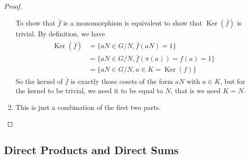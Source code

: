 \documentclass{article}
\begin{document}
\begin{proof}
\begin{enumerate}
To show that $\bar{f}$ is a monomorphism is equivalent to show that $\operatorname{Ker}(\bar{f})$ is trivial. By definition, we have
\begin{align*}
\begin{aligned}
\operatorname{Ker}(\bar{f}) &=\{a N \in G / N, \bar{f}(a N)=1\} \\
&=\{a N \in G / N, \bar{f}(\pi(a))=f(a)=1\} \\
&=\{a N \in G / N, a \in K=\operatorname{Ker}(f)\}
\end{aligned}
\end{align*}
So the kernel of $\bar{f}$ is exactly those cosets of the form $a N$ with $a \in K$, but for the kernel to be trivial, we need it to be equal to $N$, that is we need $K=N$.
\item This is just a combination of the first two parts.
\end{enumerate}
\end{proof}

\subsection{Direct Products and Direct Sums}
\end{document}
